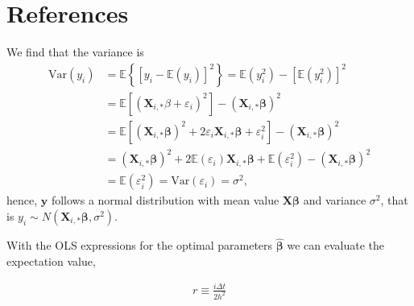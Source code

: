 \documentclass[reprint,english,notitlepage]{revtex4-1}  %
\begin{document}







\newpage 
\section*{References}
\printbibliography[heading=none]

\newpage



We find that the variance is 
\begin{align}
    \text{Var}(y_i) 
    & = \mathbb{E}\left\{\left[y_i - \mathbb{E}(y_i)\right]^2\right\} = \mathbb{E}\left(y_i^2\right) - \left[\mathbb{E}\left(y_i^2\right)\right]^2 \nonumber \\ 
    & = \mathbb{E}\left[\left(\mathbf{X}_{i,*}\beta + \varepsilon_i\right)^2\right] - \left(\mathbf{X}_{i,*}\boldsymbol{\beta}\right)^2 \nonumber \\ 
    & = \mathbb{E}\left[\left(\mathbf{X}_{i,*}\boldsymbol{\beta}\right)^2 + 2\varepsilon_i\mathbf{X}_{i,*}\boldsymbol{\beta} + \varepsilon_i^2\right] - \left(\mathbf{X}_{i,*}\boldsymbol{\beta}\right)^2 \nonumber \\ 
    & =(\boldsymbol{X}_{i,*}\boldsymbol{\beta})^2 + 2 \mathbb{E}(\varepsilon_i)\mathbf{X}_{i,*}\boldsymbol{\beta} + \mathbb{E}(\varepsilon^2_i) - (\mathbf{X}_{i,*}\boldsymbol{\beta})^2 \nonumber \\ 
    & = \mathbb{E}(\varepsilon^2_i) = \text{Var}(\varepsilon_i) = \sigma^2, 
\end{align}
hence, $\boldsymbol{y}$ follows a normal distribution with mean value $\mathbf{X}\boldsymbol{\beta}$ and variance $\sigma^2$, that is $y_i\sim N(\mathbf{X}_{i,*}\boldsymbol{\beta},\sigma^2)$. 

With the OLS expressions for the optimal parameters $\boldsymbol{\hat{\beta}}$ we can evaluate the expectation value, 



\begin{align}
    r \equiv \frac{i\Delta t}{2h^2}
\end{align}


\end{document}
